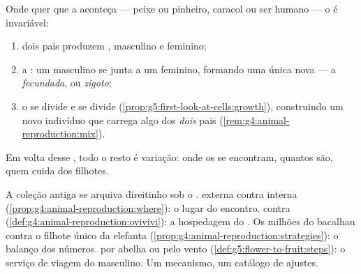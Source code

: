 \begin{proposition}\label{prop:g8:sexual-reproduction:core}
Onde quer que a  aconteça --- peixe ou pinheiro,
caracol ou ser humano --- o  é invariável:
\begin{enumerate}
  \item dois pais produzem , masculino e feminino;
  \item a \emph{}: um  masculino se junta a um 
        feminino, formando uma única  nova --- a
        \emph{ fecundada}, ou
        \emph{zigoto};
  \item o  se divide e se divide
        (\cref{prop:g5:first-look-at-cells:growth}), construindo um
        novo indivíduo que carrega algo dos \emph{dois} pais
        (\cref{rem:g4:animal-reproduction:mix}).
\end{enumerate}
Em volta desse , todo o resto é variação: onde os  se
encontram, quantos são, quem cuida dos filhotes.
\end{proposition}
\admitted

\begin{example}\label{ex:g8:sexual-reproduction:variations}
A coleção antiga se arquiva direitinho sob o . 
externa contra interna
(\cref{prop:g4:animal-reproduction:where}): o lugar do encontro.
 contra 
(\cref{def:g4:animal-reproduction:ovivivi}): a hospedagem do .
Os milhões do bacalhau contra o filhote único da elefanta
(\cref{prop:g4:animal-reproduction:strategies}): o balanço dos
números.  por abelha ou pelo vento
(\cref{def:g5:flower-to-fruit:steps}): o serviço de viagem do 
masculino. Um mecanismo, um catálogo de ajustes.
\end{example}

